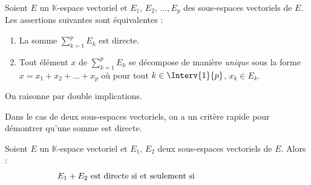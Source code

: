 \documentclass[french,11pt,twoside]{VcCours}
\newcommand{\Sum}[2]{\ensuremath{\textstyle{\sum\limits_{#1}^{#2}}}}
\begin{document}
\begin{Proposition}{}
Soient $E$ un $\mathbb{K}$-espace vectoriel et $E_1$, $E_2$, $\ldots, E_p$ des sous-espaces vectoriels de $E$. Les assertions suivantes sont équivalentes :
\begin{enumerate}
\item La somme $\Sum{k=1}{p} E_k$ est directe.
\item Tout élément $x$ de $\Sum{k=1}{p} E_k$ se décompose de manière \emph{unique} sous la forme $x = x_1 + x_2 + \ldots + x_p$ où pour tout $k \in \Interv{1}{p}$, $x_k \in E_k$.
\end{enumerate}
\end{Proposition}

\begin{Demonstration}{} On raisonne par double implications.



\vspace{10cm}

\newpage

\phantom{bla}

\vspace{8.5cm}
%
%
\end{Demonstration}
 
 Dans le cas de deux sous-espaces vectoriels, on a un critère rapide pour démontrer qu'une somme est directe.
 
 \begin{Proposition}{}\label{SommeDir2}
 Soient $E$ un $\mathbb{K}$-espace vectoriel et $E_1$, $E_2$ deux sous-espaces vectoriels de $E$. Alors :
 $$ E_1 + E_2 \hbox{ est directe si et seulement si }\phantom{ E_1 \cap E_2 = \lbrace 0_E \rbrace} $$
 \end{Proposition}
 
\end{document}
